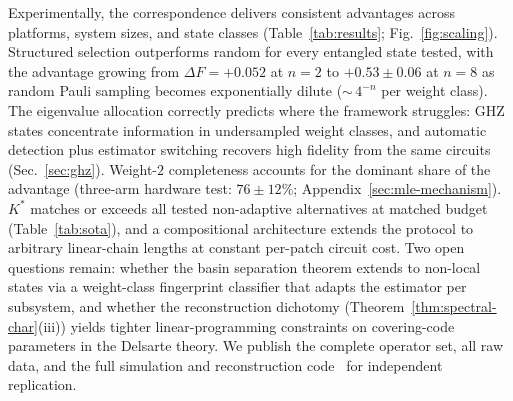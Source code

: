 \documentclass[twocolumn,prx,aps,superscriptaddress,longbibliography,floatfix]{revtex4-2}
\begin{document}
Experimentally, the correspondence delivers consistent
advantages across platforms, system sizes, and state classes
(Table~\ref{tab:results}; Fig.~\ref{fig:scaling}).
Structured selection outperforms random for every entangled
state tested, with the advantage growing from
$\Delta F = +0.052$ at $n = 2$ to $+0.53 \pm 0.06$ at $n = 8$
as random Pauli sampling becomes exponentially dilute
(${\sim}\,4^{-n}$ per weight class).
The eigenvalue allocation correctly predicts where the
framework struggles: GHZ states concentrate information in
undersampled weight classes, and automatic detection plus
estimator switching recovers high fidelity from the same
circuits (Sec.~\ref{sec:ghz}).
Weight-$2$ completeness accounts for the dominant share of
the advantage (three-arm hardware test: $76 \pm 12$\%;
Appendix~\ref{sec:mle-mechanism}).
$K^*$ matches or exceeds all tested non-adaptive alternatives
at matched budget (Table~\ref{tab:sota}), and a compositional
architecture extends the protocol to arbitrary linear-chain
lengths at constant per-patch circuit cost.
Two open questions remain: whether the basin separation theorem
extends to non-local states via a weight-class fingerprint
classifier that adapts the estimator per subsystem, and whether the
reconstruction dichotomy (Theorem~\ref{thm:spectral-char}(iii))
yields tighter linear-programming constraints on covering-code
parameters in the Delsarte theory.
We publish the complete operator set, all raw
data, and the full simulation and reconstruction
code~\cite{supplemental} for independent replication.
\end{document}
